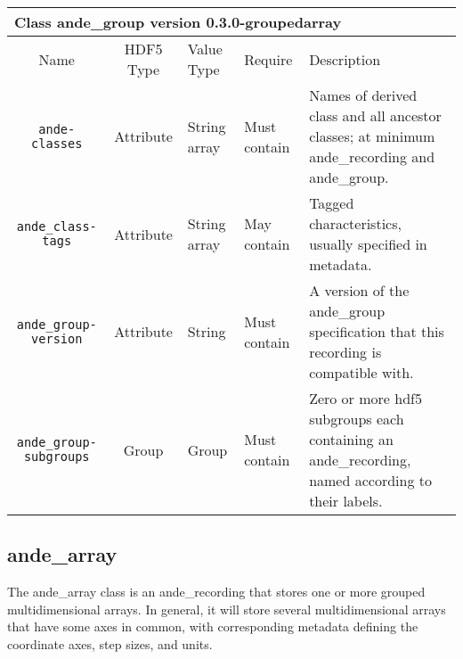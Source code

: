 \documentclass{article}
\newenvironment{AndeClass}[3]{
  
  \begin{tabular}{|c c p{.4in} p{.5in} p{2.9in}|}
    \multicolumn{5}{l}{{\Large \bf Class}{\Large \ttfamily \fontseries{b} #1} version #2 \ifthenelse{\equal{#3}{}}{}{; derives from #3}} \\
    \hline
    Name & HDF5 Type & Value Type & Require & Description \\
    \hline
}{
  \hline
  \end{tabular}
}
\newcommand{\AndeElementLine}[5]{{\tt #1} & #2 & #3 & #4 & #5 \\}
\newcommand{\AndeClassesLine}[1]{
  \AndeElementLine{ande-classes}{Attribute}{String array}{Must contain}{
    Names of derived class and all ancestor classes; at minimum #1.
  }
}
\newcommand{\AndeClassTagsLine}[1]{
  \AndeElementLine{ande\_class-tags}{Attribute}{String array}{May contain}{
    Tagged characteristics, usually specified in metadata\ifthenelse{\equal{#1}{}}{}{; at minimum #1}.
  }
}
\begin{document}
\newcommand{\AndeGroupElements}{
    \AndeElementLine{ande\_group-version}{Attribute}{String}{Must contain}{
      A version of the ande\_group specification that this recording is compatible with.
    }
    \AndeElementLine{ande\_group-subgroups}{Group}{Group}{Must contain}{
      Zero or more hdf5 subgroups each containing an ande\_recording, named according to their labels.
    }
  }

\begin{AndeClass}{ande\_group}{0.3.0-groupedarray}{ande\_recording}
  \AndeClassesLine{ande\_recording and ande\_group}
  \AndeClassTagsLine{}
  \AndeRecordingElements
  \AndeGroupElements %
\end{AndeClass}

\subsection{ande\_array}
The ande\_array class is an ande\_recording that stores one or more grouped multidimensional arrays. In general, it will store several multidimensional arrays that have some axes in common,  with corresponding metadata defining the coordinate axes, step sizes, and units. 
\end{document}
